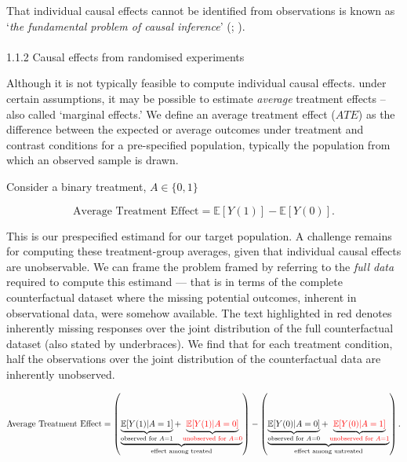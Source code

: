\documentclass[
  single column]{article}
\makeatletter
\let\oldparagraph\paragraph
\renewcommand{\paragraph}{
    \@ifstar
      \xxxParagraphStar
      \xxxParagraphNoStar
  }
\newcommand{\xxxParagraphStar}[1]{\oldparagraph*{#1}\mbox{}}
\newcommand{\xxxParagraphNoStar}[1]{\oldparagraph{#1}\mbox{}}
\makeatother
\begin{document}
That individual causal effects cannot be identified from observations is
known as `\emph{the fundamental problem of causal inference}'
(;
).

\paragraph{1.1.2 Causal effects from randomised
experiments}\label{causal-effects-from-randomised-experiments}

Although it is not typically feasible to compute individual causal
effects. under certain assumptions, it may be possible to estimate
\emph{average} treatment effects -- also called `marginal effects.' We
define an average treatment effect (\(ATE\)) as the difference between
the expected or average outcomes under treatment and contrast conditions
for a pre-specified population, typically the population from which an
observed sample is drawn.

Consider a binary treatment, \(A \in \{0,1\}\)

\[
\text{Average Treatment Effect}  = \mathbb{E}[Y(1)] - \mathbb{E}[Y(0)].
\]

This is our prespecified estimand for our target population. A challenge
remains for computing these treatment-group averages, given that
individual causal effects are unobservable. We can frame the problem
framed by referring to the \emph{full data} required to compute this
estimand --- that is in terms of the complete counterfactual dataset
where the missing potential outcomes, inherent in observational data,
were somehow available. The text highlighted in red denotes inherently
missing responses over the joint distribution of the full counterfactual
dataset (also stated by underbraces). We find that for each treatment
condition, half the observations over the joint distribution of the
counterfactual data are inherently unobserved.

\[
\text{Average Treatment Effect} = \left(\underbrace{\underbrace{\mathbb{E}[Y(1)|A = 1]}_{\text{observed for } A = 1} + \underbrace{\textcolor{red}{\mathbb{E}[Y(1)|A = 0]}}_{\textcolor{red}{\text{unobserved for } A = 0}}}_{\text{effect among treated}}\right) - \left(\underbrace{\underbrace{\mathbb{E}[Y(0)|A = 0]}_{\text{observed for } A = 0} + \underbrace{\textcolor{red}{\mathbb{E}[Y(0)|A = 1]}}_{\textcolor{red}{\text{unobserved for } A = 1}}}_{\text{effect among untreated}}\right).
\]
\end{document}
